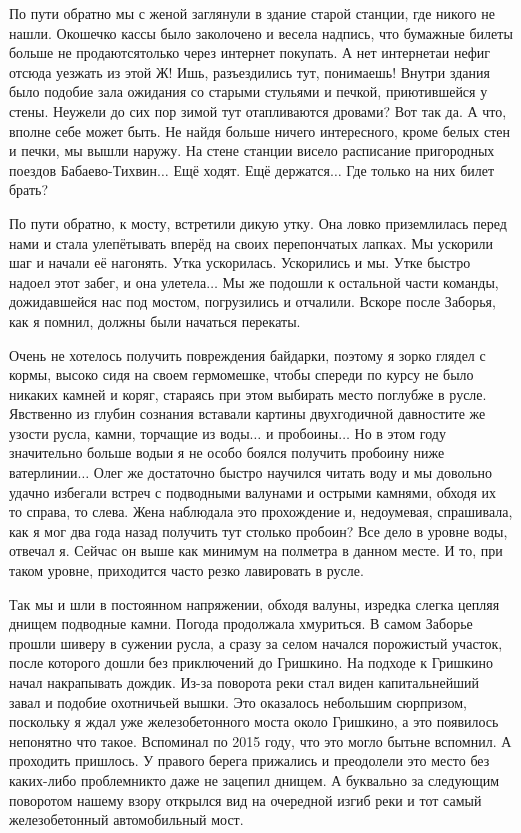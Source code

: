 По пути обратно мы с женой заглянули в здание старой станции, где никого не нашли. Окошечко кассы было заколочено и весела надпись, что бумажные билеты больше не продаются\mdash только через интернет покупать. А нет интернета\mdash и нефиг отсюда уезжать из этой Ж! Ишь, разъездились тут, понимаешь! Внутри здания было подобие зала ожидания со старыми стульями и печкой, приютившейся у стены. Неужели до сих пор зимой тут отапливаются дровами? Вот так да. А что, вполне себе может быть. Не найдя больше ничего интересного, кроме белых стен и печки, мы вышли наружу. На стене станции висело расписание пригородных поездов Бабаево-Тихвин$\ldots$ Ещё ходят. Ещё держатся$\ldots$ Где только на них билет брать?

По пути обратно, к мосту, встретили дикую утку. Она ловко приземлилась перед нами и стала улепётывать вперёд на своих перепончатых лапках. Мы ускорили шаг и начали её нагонять. Утка ускорилась. Ускорились и мы. Утке быстро надоел этот забег, и она улетела$\ldots$ Мы же подошли к остальной части команды, дожидавшейся нас под мостом, погрузились и отчалили. Вскоре после Заборья, как я помнил, должны были начаться перекаты.

Очень не хотелось получить повреждения байдарки, поэтому я зорко глядел с кормы, высоко сидя на своем гермомешке, чтобы спереди по курсу не было никаких камней и коряг, стараясь при этом выбирать место поглубже в русле. Явственно из глубин сознания вставали картины двухгодичной давности\mdash те же узости русла, камни, торчащие из воды$\ldots$ и пробоины$\ldots$ Но в этом году значительно больше воды\mdash и я не особо боялся получить пробоину ниже ватерлинии$\ldots$ Олег же достаточно быстро научился читать воду и мы довольно удачно избегали встреч с подводными валунами и острыми камнями, обходя их то справа, то слева. Жена наблюдала это прохождение и, недоумевая, спрашивала, как я мог два года назад получить тут столько пробоин? Все дело в уровне воды, отвечал я. Сейчас он выше как минимум на полметра в данном месте. И то, при таком уровне, приходится часто резко лавировать в русле. 

Так мы и шли в постоянном напряжении, обходя валуны, изредка слегка цепляя днищем подводные камни. Погода продолжала хмуриться. В самом Заборье прошли шиверу в сужении русла, а сразу за селом начался порожистый участок, после которого дошли без приключений до Гришкино. На подходе к Гришкино начал накрапывать дождик. Из-за поворота реки стал виден капитальнейший завал и подобие охотничьей вышки. Это оказалось небольшим сюрпризом, поскольку я ждал уже железобетонного моста около Гришкино, а это появилось непонятно что такое. Вспоминал по 2015 году, что это могло быть\mdash не вспомнил. А проходить пришлось. У правого берега прижались и преодолели это место без каких-либо проблем\mdash никто даже не зацепил днищем. А буквально за следующим поворотом нашему взору открылся вид на очередной изгиб реки и тот самый железобетонный автомобильный мост. 

